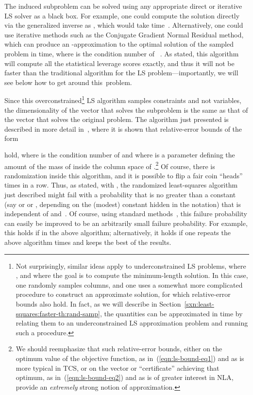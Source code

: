 \documentclass[twoside]{article}
\begin{document}
\noindent
The induced subproblem can be solved using any appropriate direct or 
iterative LS solver as a black box.
For example, one could compute the solution directly via the generalized 
inverse as , which would 
take  time~\cite{GVL96}.
Alternatively, one could use iterative methods such as the Conjugate 
Gradient Normal Residual method, which can produce an 
-approximation to the optimal solution of the sampled problem in 
 time, where  is the 
condition number of ~\cite{GVL96}.
As stated, this algorithm will compute all the statistical leverage scores
exactly, and thus it will not be faster than the traditional algorithm for
the LS problem---importantly, we will see below how to get around 
this~problem.

Since this overconstrained\footnote{Not surprisingly, similar ideas apply to underconstrained LS 
problems, where , and where the goal is to compute the 
minimum-length solution.  In this case, one randomly samples columns, and 
one uses a somewhat more complicated procedure to construct an approximate 
solution, for which relative-error bounds also hold.  In fact, as we will 
describe in Section~\ref{sxn:least-squares:faster-th:rand-samp},
the quantities  can be approximated in  
time by relating them to an underconstrained LS approximation problem and 
running such a procedure.}
LS algorithm samples constraints and not variables, the 
dimensionality of the vector  that solves the subproblem is 
the same as that of the vector  that solves the original problem.
The algorithm just presented is described in more detail 
in~\cite{DMM06,DMM08_CURtheory_JRNL,DMMS07_FastL2_NM10},
where it is shown that relative-error bounds of the form 

hold, where  is the condition number of  and where 
 is a parameter defining the amount of the 
mass of  inside the column space of .\footnote{We should reemphasize that such relative-error bounds, either on the 
optimum value of the objective function, as in~(\ref{eqn:ls-bound-eq1}) and 
as is more typical in TCS, or on the vector or ``certificate'' achieving 
that optimum, as in~(\ref{eqn:ls-bound-eq2}) and as is of greater interest 
in NLA, provide an \emph{extremely} strong notion of approximation.}
Of course, there is randomization inside this algorithm, and it is possible
to flip a fair coin ``heads''  times in a row.
Thus, as stated, with , the randomized 
least-squares algorithm just described might fail with a probability 
 that is no greater than a constant (say  or  or , 
depending on the (modest) constant hidden in the  notation) that 
is independent of  and~.
Of course, using standard methods~\cite{MotwaniRaghavan95}, this failure 
probability can easily be improved to be an arbitrarily small  
failure probability.
For example, this holds if  in the above 
algorithm;
alternatively, it holds if one repeats the above algorithm  times 
and keeps the best of the results. 
\end{document}
